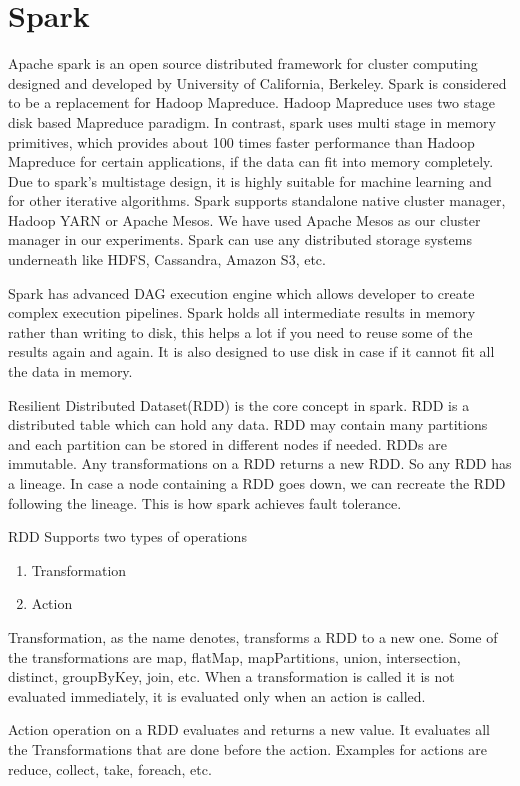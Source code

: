 \medskip

\section{Spark}
Apache spark is an open source distributed framework for cluster
computing designed and developed by University of California,
Berkeley. Spark is considered to be a replacement for Hadoop
Mapreduce. Hadoop Mapreduce uses two stage disk based Mapreduce
paradigm. In contrast,
spark uses multi stage in memory primitives, which provides about 100 times
faster performance than Hadoop Mapreduce for certain applications, if the data can fit into
memory completely. Due to spark's multistage design, it is highly
suitable for machine learning and for other iterative algorithms.
Spark supports standalone native cluster manager, Hadoop YARN or
Apache Mesos. We have used Apache Mesos as our cluster manager in our
experiments. Spark can use any distributed storage systems underneath
like HDFS, Cassandra, Amazon S3, etc.

Spark has advanced DAG execution engine which allows developer to
create complex execution pipelines. Spark holds all intermediate
results in memory rather than writing to disk, this helps a lot if you
need to reuse some of the results again and again. It is also designed
to use disk in case if it cannot fit all the data in memory.

Resilient Distributed Dataset(RDD) is the core concept in spark. RDD
is a distributed table which can hold any data. RDD may contain many
partitions and each partition can be stored in different nodes if needed.
RDDs are immutable. Any transformations on a RDD returns a new
RDD. So any RDD has a lineage. In case a node containing a RDD goes
down, we can recreate the RDD following the lineage. This is
how spark achieves fault tolerance.

RDD Supports two types of operations
\begin{enumerate}
\item Transformation
\item Action
\end{enumerate}

Transformation, as the name denotes, transforms a RDD to a new
one. Some of the transformations are map, flatMap, mapPartitions,
union, intersection, distinct, groupByKey, join, etc. When a
transformation is called it is not evaluated immediately, it is
evaluated only when an action is called.

Action operation on a RDD evaluates and returns a new value. It
evaluates all the Transformations that are done before the
action. Examples for actions are reduce, collect, take, foreach, etc.

